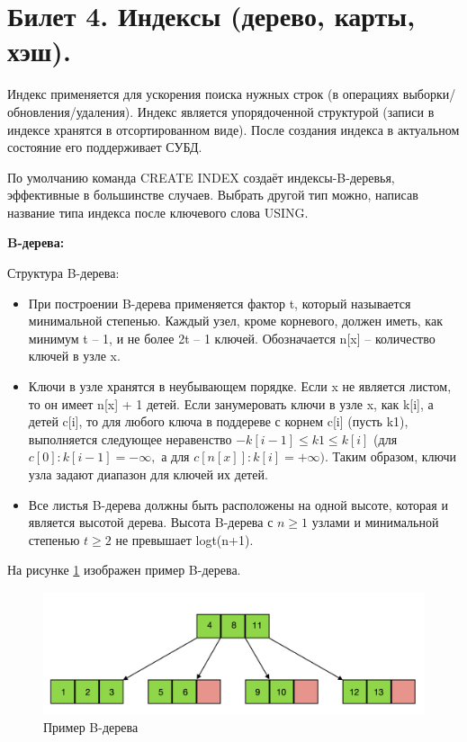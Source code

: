 \newpage
\section {Билет 4. Индексы (дерево, карты, хэш).}

Индекс применяется для ускорения поиска нужных строк (в операциях
выборки/обновления/удаления). Индекс является упорядоченной структурой (записи в индексе хранятся в отсортированном виде). После создания индекса в актуальном состояние его поддерживает СУБД.

По умолчанию команда CREATE INDEX создаёт индексы-B-деревья, эффективные в большинстве случаев. Выбрать другой тип можно, написав название типа индекса после ключевого слова USING. 

\textbf{B-дерева:} 

Структура B-дерева: 
\begin{itemize}
    \item При построении B-дерева применяется фактор t, который называется минимальной степенью. Каждый узел, кроме корневого, должен иметь, как минимум t – 1, и не более 2t – 1 ключей. Обозначается n[x] – количество ключей в узле x.
    \item Ключи в узле хранятся в неубывающем порядке. Если x не является листом, то он имеет n[x] + 1 детей. Если занумеровать ключи в узле x, как k[i], а детей c[i], то для любого ключа в поддереве с корнем c[i] (пусть k1), выполняется следующее неравенство $-k[i-1] \leq k1 \leq k[i]$ (для $c[0]: k[i-1] = -\infty,$ а для $c[n[x]]: k[i] = +\infty)$. Таким образом, ключи узла задают диапазон для ключей их детей.
    \item Все листья B-дерева должны быть расположены на одной высоте, которая и является высотой дерева. Высота B-дерева с $n \geq 1$ узлами и минимальной степенью $t\geq 2$ не превышает logt(n+1).
\end{itemize}

На рисунке \ref{fig:tree} изображен пример B-дерева. 

\begin{figure}[!h]
    \centering
    \includegraphics[scale = 0.1]{4/B-tree.png}
    \caption{Пример B-дерева}
    \label{fig:tree}
\end{figure}


